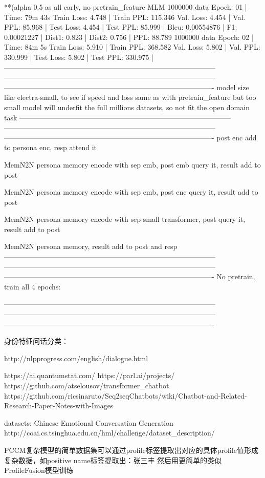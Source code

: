 \documentclass[letterpaper]{article} %
\begin{document}
\begin{CJK*}{UTF8}{gbsn}
**(alpha 0.5 as all early, no pretrain_feature MLM %
1000000 data
Epoch: 01 | Time: 79m 43s
	Train Loss: 4.748 | Train PPL: 115.346
	 Val. Loss: 4.454 |  Val. PPL:  85.968
| Test Loss: 4.454 | Test PPL:  85.999 |
Bleu: 0.00554876 | F1: 0.00021227 | Dist1: 0.823 | Dist2: 0.756 | PPL:  88.789
1000000 data
Epoch: 02 | Time: 84m 5s
	Train Loss: 5.910 | Train PPL: 368.582
	 Val. Loss: 5.802 |  Val. PPL: 330.999
| Test Loss: 5.802 | Test PPL: 330.975 |
-----------------------------------------------------------------------------------------
-----------------------------------------------------------------------------------------
----------------------------------------------------------------------------------------
model size like electra-small, to see if speed and loss same as with pretrain_feature
but too small model will underfit the full millions datasets, so not fit the open domain task
-----------------------------------------------------------------------------------------
-----------------------------------------------------------------------------------------
----------------------------------------------------------------------------------------
post enc add to persona enc, resp attend it

MemN2N persona memory encode with sep emb, post emb query it, result add to post

MemN2N persona memory encode with sep emb, post enc query it, result add to post

MemN2N persona memory encode with sep small transformer, post query it, result add to post

MemN2N persona memory, result add to post and resp
-----------------------------------------------------------------------------------------
-----------------------------------------------------------------------------------------
----------------------------------------------------------------------------------------
No pretrain, train all 4 epochs:

-----------------------------------------------------------------------------------------
-----------------------------------------------------------------------------------------
----------------------------------------------------------------------------------------



身份特征问话分类：


http://nlpprogress.com/english/dialogue.html

https://ai.quantumstat.com/
https://parl.ai/projects/
https://github.com/atselousov/transformer\_chatbot
https://github.com/ricsinaruto/Seq2seqChatbots/wiki/Chatbot-and-Related-Research-Paper-Notes-with-Images


datasets:
Chinese Emotional Conversation Generation
http://coai.cs.tsinghua.edu.cn/hml/challenge/dataset\_description/


PCCM复杂模型的简单数据集可以通过profile标签提取出对应的具体profile值形成复杂数据，如positive name标签提取出：张三丰
然后用更简单的类似ProfileFusion模型训练

\clearpage\end{CJK*}
\end{document}
